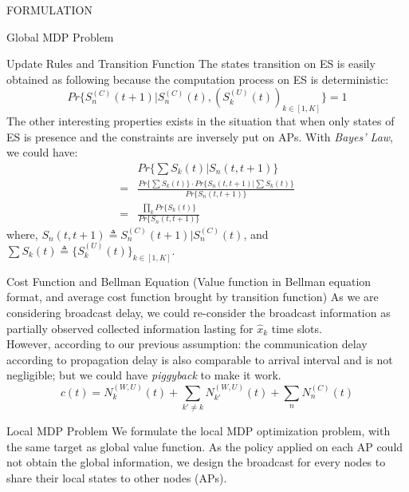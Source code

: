 \documentclass[10pt, conference, letterpaper]{IEEEtran}
\begin{document}
\begin{section}{FORMULATION}
\begin{subsection}{Global MDP Problem}
\begin{subsubsection}{Update Rules and Transition Function}
                The states transition on ES is easily obtained as following because the computation process on ES is deterministic:
                $$
                Pr\{S_{n}^{(C)}(t+1) |S_{n}^{(C)}(t), (S_{k}^{(U)}(t))_{k \in [1,K]}  \} = 1
                $$
                The other interesting properties exists in the situation that when only states of ES is presence and the constraints are inversely put on APs. With \emph{Bayes' Law}, we could have:
                \begin{align*}
                    & Pr\{ \sum{S_k(t)} | S_n(t,t+1) \} \\
                    =& \frac{ Pr\{\sum{S_k(t)}\} \cdot Pr\{S_n(t,t+1)|\sum{S_k(t)}\} }{ Pr\{S_n(t,t+1)\} } \\
                    =& \frac{
                            \prod_k Pr\{S_k(t)\}
                        }{
                            Pr\{S_n(t,t+1)\}
                        }
                \end{align*}
                where, $S_n(t,t+1) \triangleq S_{n}^{(C)}(t+1) |S_{n}^{(C)}(t)$, and $\sum{S_k(t)} \triangleq \{S_{k}^{(U)}(t)\}_{k \in [1,K]}$.
            \end{subsubsection}

            \begin{subsubsection}{Cost Function and Bellman Equation}
                (Value function in Bellman equation format, and average cost function brought by transition function)
                As we are considering broadcast delay, we could re-consider the broadcast information as partially observed collected information lasting for $\hat{x}_k$ time slots.
                \\
                However, according to our previous assumption: the communication delay according to propagation delay is also comparable to arrival interval and is not negligible; but we could have \emph{piggyback} to make it work.
                \\
                $$
                c(t) = N_k^{(W,U)}(t) + \sum_{k' \neq k} N_{k'}^{(W,U)}(t) + \sum_{n} N_{n}^{(C)}(t)
                $$
            \end{subsubsection}
        \end{subsection}

        \begin{subsection}{Local MDP Problem}
            We formulate the local MDP optimization problem, with the same target as global value function. As the policy applied on each AP could not obtain the global information, we design the broadcast for every nodes to share their local states to other nodes (APs).
            

\end{subsection}
\end{section}
\end{document}
